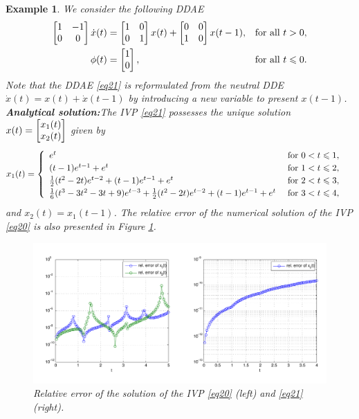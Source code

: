 \documentclass[final,reqno]{siamltex}
\newtheorem{example}[theorem]{Example}
\begin{document}
\begin{example}\label{Exa2} We consider the following DDAE
%
\begin{equation}\label{eq21}
\begin{aligned}
\m{
1&-1\\
0&0 
}
\dot{x}(t) &=
\m{
1& 0\\
0&1 
}
x(t) + 
\m{
0& 0\\
1&0
}
x(t-1), && \mbox{for all } t>0,\\
\phi(t) &=
\m{
1\\
0 
},
&& \mbox{for all } t \leq 0.
\end{aligned}
\end{equation}
%
Note that the DDAE \eqref{eq21} is reformulated from the neutral DDE $\dot{x}(t)=x(t)+\dot{x}(t-1)$ by introducing a new variable to present $x(t-1)$.\\
{\bf Analytical solution:}\quad The IVP \eqref{eq21} possesses the unique solution 
$x(t)= \begin{bmatrix} x_1(t) \\ x_2(t) \end{bmatrix}$ given by
\begin{align*}
x_1(t)=
\begin{cases}
\begin{array}{ll}
e^t & \mbox{ for } 0<t\leqslant1, \\
(t-1)e^{t-1}+e^t & \mbox{ for } 1<t\leqslant2, \\
\tfrac12(t^2-2t)e^{t-2}+(t-1)e^{t-1}+e^t & \mbox{ for } 2<t\leqslant3,\\
\tfrac16(t^3-3t^2-3t+9)e^{t-3}+\tfrac12 (t^2-2t)e^{t-2}+(t-1)e^{t-1}+e^t & \mbox{ for } 3<t\leqslant4,
\end{array}
\end{cases}
\end{align*}
and
$x_2(t)=x_1(t-1)$. The relative error of the numerical solution of the IVP \eqref{eq20} is also presented in Figure \ref{fig_Paul}.

\begin{figure}[h]
 \centering
 \includegraphics[width=\textwidth]{plot_149_214.pdf}
 \caption{Relative error of the solution of the IVP \eqref{eq20} (left) and \eqref{eq21} (right).}
 \label{fig_Paul}
\end{figure}
\end{example}
\end{document}
